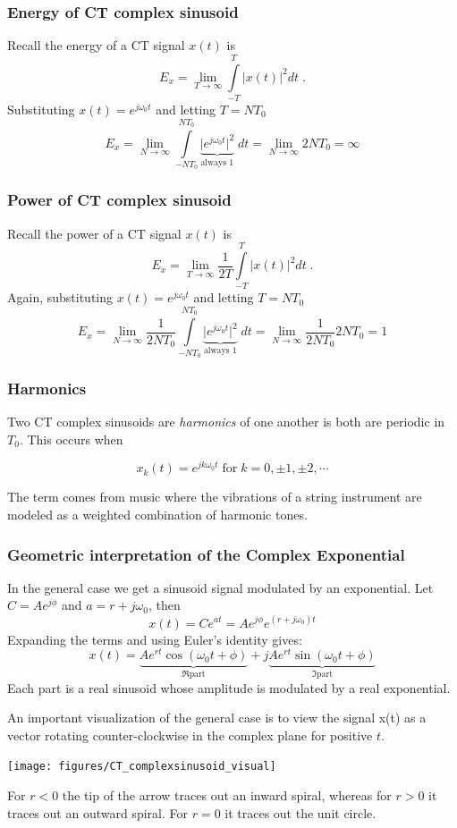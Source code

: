 \subsubsection{Energy of CT complex sinusoid}

Recall the energy of a CT signal $x(t)$ is    
\[
  E_x = \lim_{T\rightarrow\infty} \int\limits_{-T}^T \lvert x(t) \rvert^2 dt \; .
\]
Substituting $x(t) = e^{j\omega_0 t}$ and letting $T = N T_0$
  \[
    E_x = \lim_{N\rightarrow\infty} \int\limits_{-N T_0}^{N T_0} \underbrace{\lvert e^{j\omega_0 t} \rvert^2}_{\text{always 1}} \; dt = \lim_{N\rightarrow\infty} 2NT_0 = \infty
  \]

\subsubsection{Power of CT complex sinusoid}

Recall the power of a CT signal $x(t)$ is
\[
  E_x = \lim_{T\rightarrow\infty} \frac{1}{2T} \int\limits_{-T}^T \lvert x(t) \rvert^2 dt \; .
\]
Again, substituting $x(t) = e^{j\omega_0 t}$ and letting $T = N T_0$
\[
  E_x = \lim_{N\rightarrow\infty} \frac{1}{2NT_0} \int\limits_{-N T_0}^{N T_0} \underbrace{\lvert e^{j\omega_0 t} \rvert^2}_{\text{always 1}} \; dt = \lim_{N\rightarrow\infty} \frac{1}{2NT_0} 2NT_0 = 1
\]
  
\subsubsection{Harmonics}

Two CT complex sinusoids are {\it harmonics} of one another is both are periodic in $T_0$. This occurs when

\[
    x_k(t) = e^{jk\omega_0 t} \; \text{for} \; k = 0, \pm 1, \pm 2, \cdots
\]

The term comes from music where the vibrations of a string instrument are modeled as a weighted combination of harmonic tones. 

\subsubsection{Geometric interpretation of the Complex Exponential}

In the general case we get a sinusoid signal modulated by an exponential. Let $C = Ae^{j\phi}$ and $a = r + j\omega_0$, then
\[
  x(t) = C e^{a t} =  Ae^{j\phi} e^{(r+j\omega_0)t}
\]
Expanding the terms and using Euler's identity gives:
\[
x(t) = \underbrace{Ae^{rt}\cos(\omega_0 t+\phi)}_{\Re \text{part}} + j \underbrace{Ae^{rt}\sin(\omega_0 t+\phi)}_{\Im \text{part}}
\]
Each part is a real sinusoid whose amplitude is modulated by a real exponential.

An important visualization of the general case is to view the signal x(t) as a vector rotating counter-clockwise in the complex plane for positive $t$.

\begin{center}
 \texttt{[image: figures/CT\_complexsinusoid\_visual]}
\end{center}

For $r < 0$ the tip of the arrow traces out an inward spiral, whereas for $r > 0$ it traces out an outward spiral. For $r = 0$ it traces out the unit circle.
